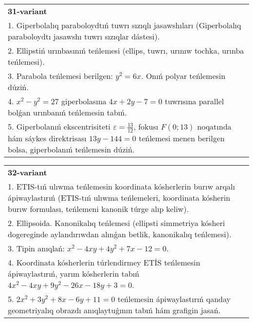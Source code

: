 \documentclass{article}
\begin{document}
\begin{tabular}{m{17cm}}
\textbf{31-variant}\\
1. Giperbolalıq paraboloydtıń tuwrı sızıqlı jasawshıları (Giperbolalıq paraboloydtı jasawshı tuwrı sızıqlar dástesi).\\

2. Ellipstiń urınbasınıń teńlemesi (ellips, tuwrı, urınıw tochka, urınba teńlemesi).\\

3. Parabola teńlemesi berilgen: $y^2=6 x$. Onıń polyar teńlemesin dúziń.\\

4. $x^{2} - y^{2} = 27$ giperbolasına $4x + 2y - 7 = 0$ tuwrısına parallel bolǵan urınbanıń teńlemesin tabıń.  \\

5. Giperbolanıń ekscentrisiteti $\varepsilon = \frac{13}{12}$, fokusı $F(0;13)$ noqatında hám sáykes direktrisası $13y - 144 = 0$ teńlemesi menen berilgen bolsa, giperbolanıń teńlemesin dúziń.  
\end{tabular}
\vspace{1cm}


\begin{tabular}{m{17cm}}
\textbf{32-variant}\\
1. ETIS-tıń ulıwma teńlemesin koordinata kósherlerin burıw arqalı ápiwaylastırıń (ETIS-tıń ulıwma teńlemeleri, koordinata kósherin burıw formulası, teńlemeni kanonik túrge alıp keliw).\\

2. Ellipsoida. Kanonikalıq teńlemesi (ellipsti simmetriya kósheri dogereginde aylandırıwdan alınǵan betlik, kanonikalıq teńlemesi).\\

3. Tipin anıqlań: $x^{2}-4 xy+4 y^{2}+7 x-12=0$.\\

4. Koordinata kósherlerin túrlendirmey ETİS teńlemesin ápiwaylastırıń, yarım kósherlerin tabıń $4x^{2} - 4xy + 9y^{2} - 26x - 18y + 3 = 0$.\\

5. $2x^{2} + 3y^{2} + 8x - 6y + 11 = 0$ teńlemesin ápiwaylastırıń qanday geometriyalıq obrazdı anıqlaytuǵının tabıń hám grafigin jasań.  
\end{tabular}
\vspace{1cm}
\end{document}
